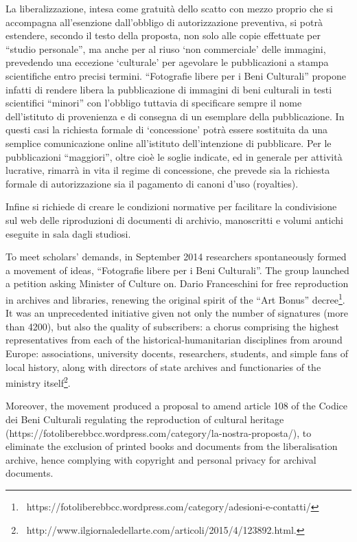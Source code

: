 \documentclass[amsthm,ebook]{saparticle}
\begin{document}
La liberalizzazione, intesa come gratuità dello scatto con mezzo proprio che si accompagna all’esenzione dall’obbligo di
autorizzazione preventiva, si potrà estendere, secondo il testo della proposta, non solo alle copie effettuate per
“studio personale”, ma anche per al riuso ‘non commerciale’ delle immagini, prevedendo una eccezione ‘culturale’ per
agevolare le pubblicazioni a stampa scientifiche entro precisi termini. “Fotografie libere per i Beni Culturali”
propone infatti di rendere libera la pubblicazione di immagini di beni culturali in testi scientifici “minori” con
l’obbligo tuttavia di specificare sempre il nome dell’istituto di provenienza e di consegna di un esemplare della
pubblicazione. In questi casi la richiesta formale di ‘concessione’ potrà essere sostituita da una semplice
comunicazione online all’istituto dell’intenzione di pubblicare. Per le pubblicazioni “maggiori”, oltre cioè le soglie
indicate, ed in generale per attività lucrative, rimarrà in vita il regime di concessione, che prevede sia la richiesta
formale di autorizzazione sia il pagamento di canoni d’uso (royalties). 

Infine si richiede di creare le condizioni normative per facilitare la condivisione sul web delle riproduzioni di
documenti di archivio, manoscritti e volumi antichi eseguite in sala dagli studiosi. 

To meet scholars’ demands, in September 2014 researchers spontaneously formed a movement of ideas, “Fotografie libere
per i Beni Culturali”. The group launched a petition asking Minister of Culture on. Dario Franceschini for free
reproduction in archives and libraries, renewing the original spirit of the “Art Bonus”
decree\footnote{\ https://fotoliberebbcc.wordpress.com/category/adesioni-e-contatti/}. It was an unprecedented
initiative given not only the number of signatures (more than 4200), but also the quality of subscribers: a chorus
comprising the highest representatives from each of the historical-humanitarian disciplines from around Europe:
associations, university docents, researchers, students, and simple fans of local history, along with directors of
state archives and functionaries of the ministry
itself\footnote{\ http://www.ilgiornaledellarte.com/articoli/2015/4/123892.html.}.

Moreover, the movement produced a proposal to amend article 108 of the Codice dei Beni Culturali regulating the
reproduction of cultural heritage (https://fotoliberebbcc.wordpress.com/category/la-nostra-proposta/), to eliminate the
exclusion of printed books and documents from the liberalisation archive, hence complying with copyright and personal
privacy for archival documents.
\end{document}
